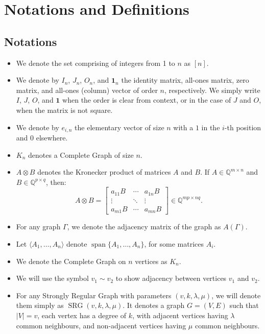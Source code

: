 \section{Notations and Definitions}

\subsection{Notations}

\begin{itemize}
    \item We denote the set comprising of integers from 1 to $n$ as $[n]$.
    \item We denote by \( I_n \), \( J_n \), \( O_n \), and \( \mathbf{1}_n \) the identity matrix, all-ones matrix, zero matrix, and all-ones (column) vector of order \( n \), respectively. We simply write \( I \), \( J \), \( O \), and \( \mathbf{1} \) when the order is clear from context, or in the case of \( J \) and \( O \), when the matrix is not square.

    \item We denote by \( e_{i,n} \) the elementary vector of size \( n \) with a \( 1 \) in the \( i \)-th position and \( 0 \) elsewhere.
    
    \item \(K_{n}\) denotes a Complete Graph of size $n$.
    
    \item \( A \otimes B \) denotes the Kronecker product of matrices \( A \) and \( B \). If \( A \in \mathbb{Q}^{m \times n} \) and \( B \in \mathbb{Q}^{p \times q} \), then:
    \[
    A \otimes B =
    \begin{bmatrix}
    a_{11}B & \cdots & a_{1n}B \\
    \vdots & \ddots & \vdots \\
    a_{m1}B & \cdots & a_{mn}B
    \end{bmatrix}
    \in \mathbb{Q}^{mp \times nq}.
    \]

    \item For any graph $\Gamma$, we denote the adjacency matrix of the graph as $A(\Gamma)$.

    \item Let $\langle A_1,\dots,A_n \rangle$ denote $\operatorname{span}\{A_1,\dots,A_n\}$, for some matrices $A_i$.

    \item We denote the Complete Graph on $n$ vertices as $K_n$.

    \item We will use the symbol $v_1\sim v_2$ to show adjacency between vertices $v_1$ and $v_2$.

    \item For any Strongly Regular Graph with parameters $(v,k,\lambda,\mu)$, we will denote them simply as $\operatorname{SRG}(v,k,\lambda,\mu)$. It denotes a graph $G=(V,E)$ such that $|V|=v$, each vertex has a degree of $k$, with adjacent vertices having $\lambda$ common neighbours, and non-adjacent vertices having $\mu$ common neighbours.
\end{itemize}


